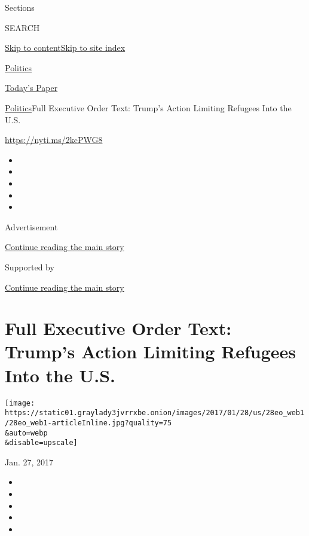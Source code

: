 Sections

SEARCH

\protect\hyperlink{site-content}{Skip to
content}\protect\hyperlink{site-index}{Skip to site index}

\href{https://www.nytimes3xbfgragh.onion/section/politics}{Politics}

\href{https://myaccount.nytimes3xbfgragh.onion/auth/login?response_type=cookie\&client_id=vi}{}

\href{https://www.nytimes3xbfgragh.onion/section/todayspaper}{Today's
Paper}

\href{/section/politics}{Politics}\textbar{}Full Executive Order Text:
Trump's Action Limiting Refugees Into the U.S.

\url{https://nyti.ms/2kcPWG8}

\begin{itemize}
\item
\item
\item
\item
\item
\end{itemize}

Advertisement

\protect\hyperlink{after-top}{Continue reading the main story}

Supported by

\protect\hyperlink{after-sponsor}{Continue reading the main story}

\hypertarget{full-executive-order-text-trumps-action-limiting-refugees-into-the-us}{%
\section{Full Executive Order Text: Trump's Action Limiting Refugees
Into the
U.S.}\label{full-executive-order-text-trumps-action-limiting-refugees-into-the-us}}

\texttt{[image: https://static01.graylady3jvrrxbe.onion/images/2017/01/28/us/28eo\_web1/28eo\_web1-articleInline.jpg?quality=75\\\&auto=webp\\\&disable=upscale]}

Jan. 27, 2017

\begin{itemize}
\item
\item
\item
\item
\item
\end{itemize}

